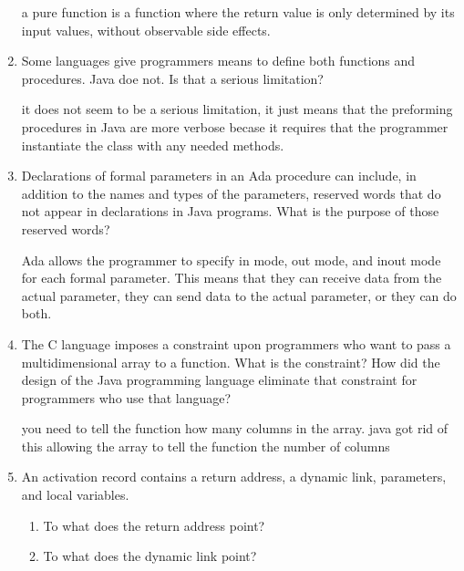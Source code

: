 \begin{enumerate}
    \begin{answer}
     a pure function is a function where the return value is only determined by
     its input values, without observable side effects.
    \end{answer}

  \item Some languages give programmers means to define
    both functions and procedures. Java doe not. Is that
    a serious limitation?

    \begin{answer}
      it does not seem to be a serious limitation, it just means that the preforming
      procedures in Java are more verbose becase it requires that the programmer
      instantiate the class with any needed methods.
    \end{answer}

  \item Declarations of formal parameters in an Ada procedure
    can include, in addition to the names and types of the
    parameters, reserved words that do not appear in declarations
    in Java programs. 
    What is the purpose of those reserved words?

    \begin{answer}
      Ada allows the programmer to specify in mode, out mode, and inout mode for each formal parameter.  This means that they can receive data from the actual parameter, they can send data to the actual parameter, or they can do both.

    \end{answer}
 
  \item The C language imposes a constraint upon programmers
    who want to pass a multidimensional array to a function.
    What is the constraint? How did the design of the Java
    programming language eliminate that constraint for 
    programmers who use that language?

  \begin{answer}

    you need to tell the function how many columns in the array. java got rid of this allowing the array to tell the function 
    the number of columns
  \end{answer}

  \item An activation record contains a return
    address, a dynamic link, parameters, and
    local variables.
  \begin{enumerate}
    \item To what does the return address point?
    \item To what does the dynamic link point?
    \end{enumerate}


\end{enumerate}
